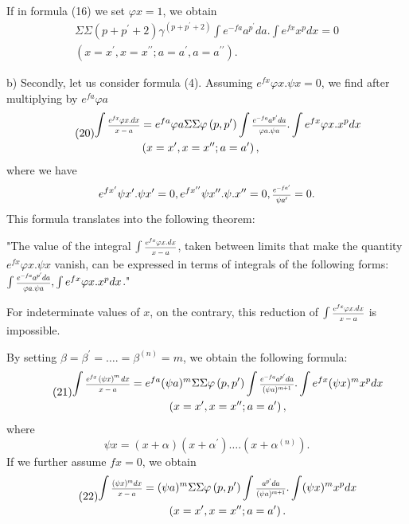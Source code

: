 \documentclass[oneside, 12 pt, leqno]{memoir}
\let\oldfrac\frac
\def\frac#1#2{\mathchoice{\text{\scalebox{.83}{${\oldfrac{#1}{#2}}$}}}{\text{\scalebox{.83}{${\displaystyle\oldfrac{#1}{#2}}$}}}{\genfrac{}{}{}{2}{#1}{#2}}{\genfrac{}{}{}{3}{#1}{#2}}}
\begin{document}
If in formula (16) we set \(\varphi x=1\), we obtain
\[\tag{19}\begin{gathered}
\Sigma \Sigma\left(p+p^{\prime}+2\right) \gamma^{\left(p+p^{\prime}+2\right)} \int e^{-f a} a^{p^{\prime}} d a. \int e^{f x} x^p d x=0 \\
\left(x=x^{\prime}, x=x^{\prime \prime} ; a=a^{\prime}, a=a^{\prime \prime}\right).
\end{gathered}\]

b) Secondly, let us consider formula (4). Assuming \(e^{f x} \varphi x. \psi x=0\), we find after multiplying by \(e^{f a} \varphi a\)
\[\tag{20}\begin{aligned}
\int \frac{e^{f x} \varphi x. d x}{x-a}&=e^{f a} \varphi a \Sigma \Sigma \varphi\left(p, p^{\prime}\right) \int \frac{e^{-f a} a^{p^{\prime}} d a}{\varphi a. \psi a}. \int e^{f x} \varphi x. x^p d x \\
&\left(x=x^{\prime}, x=x^{\prime \prime} ; a=a^{\prime}\right),
\end{aligned}\]
where we have
\[e^{f x^{\prime}} \psi x^{\prime}. \psi x^{\prime}=0, e^{f x^{\prime \prime}} \psi x^{\prime \prime}. \psi. x^{\prime \prime}=0, \frac{e^{-f a^{\prime}}}{\psi a^{\prime}}=0.\]
This formula translates into the following theorem:

"The value of the integral \(\int \frac{e^{f x} \varphi x. d x}{x-a}\), taken between limits that make the quantity \(e^{f x} \varphi x. \psi x\) vanish, can be expressed in terms of integrals of the following forms: \(\int \frac{e^{-f a} a^{p^{\prime}} d a}{\varphi a. \psi a}, \int e^{f x} \varphi x. x^p d x\)."

For indeterminate values of \(x\), on the contrary, this reduction of \(\int \frac{e^{f x} {\varphi} x. d x}{x-a}\) is impossible.

By setting \(\beta=\beta^{\prime}=\ldots.=\beta^{(n)}=m\), we obtain the following formula:
\[\tag{21}\begin{gathered}
\int \frac{e^{f x}\left(\psi x\right)^m d x}{x-a}=e^{f a}(\psi a)^m \Sigma \Sigma \varphi\left(p, p^{\prime}\right) \int \frac{e^{-f a} a^{p^{\prime}} d a}{(\psi a)^{m+1}}. \int e^{f x}(\psi x)^m x^p d x \\
\left(x=x^{\prime}, x=x^{\prime \prime} ; a=a^{\prime}\right),
\end{gathered}\]
where
\[\psi x=(x+\alpha)\left(x+\alpha^{\prime}\right) \ldots. \left(x+\alpha^{(n)}\right).\]
If we further assume \(f x=0\), we obtain
\[\tag{22}\begin{gathered}
\int \frac{(\psi x)^m d x}{x-a}=(\psi a)^m \Sigma \Sigma \varphi\left(p, p^{\prime}\right) \int \frac{a^{p^{\prime}} d a}{(\psi a)^{m+1}}. \int(\psi x)^m x^p d x \\
\left(x=x^{\prime}, x=x^{\prime \prime};  a=a^{\prime}\right).
\end{gathered}\]
\end{document}
